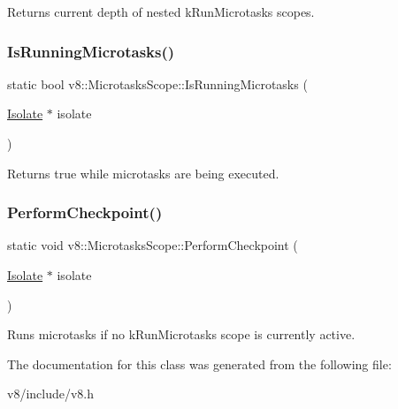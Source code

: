 Returns current depth of nested k\+Run\+Microtasks scopes. \mbox{\label{classv8_1_1MicrotasksScope_add7bcfed084afcd0d2729c3ac382145c}} 
\subsubsection{\texorpdfstring{Is\+Running\+Microtasks()}{IsRunningMicrotasks()}}
{\footnotesize\ttfamily static bool v8\+::\+Microtasks\+Scope\+::\+Is\+Running\+Microtasks (\begin{DoxyParamCaption}\item[{\mbox{\hyperlink{classv8_1_1Isolate}{Isolate}} $\ast$}]{isolate }\end{DoxyParamCaption})\hspace{0.3cm}{\ttfamily [static]}}

Returns true while microtasks are being executed. \mbox{\label{classv8_1_1MicrotasksScope_a1995095b585828067d367d5362bef65e}} 
\subsubsection{\texorpdfstring{Perform\+Checkpoint()}{PerformCheckpoint()}}
{\footnotesize\ttfamily static void v8\+::\+Microtasks\+Scope\+::\+Perform\+Checkpoint (\begin{DoxyParamCaption}\item[{\mbox{\hyperlink{classv8_1_1Isolate}{Isolate}} $\ast$}]{isolate }\end{DoxyParamCaption})\hspace{0.3cm}{\ttfamily [static]}}

Runs microtasks if no k\+Run\+Microtasks scope is currently active. 

The documentation for this class was generated from the following file\+:\begin{DoxyCompactItemize}
\item 
v8/include/v8.\+h\end{DoxyCompactItemize}
